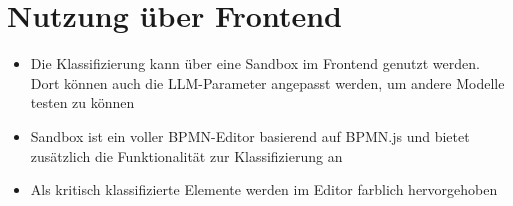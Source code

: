 \section{Nutzung über Frontend}\label{sec:nutzung-uber-frontend}

\begin{itemize}
    \item Die Klassifizierung kann über eine Sandbox im Frontend genutzt werden. Dort können auch die LLM-Parameter angepasst werden, um andere Modelle testen zu können
    \item Sandbox ist ein voller BPMN-Editor basierend auf BPMN.js und bietet zusätzlich die Funktionalität zur Klassifizierung an
    \item Als kritisch klassifizierte Elemente werden im Editor farblich hervorgehoben
\end{itemize}